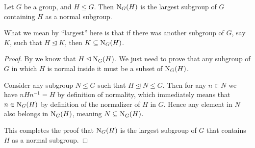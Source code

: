 \begin{proposition}\label{prop-normalizer-of-subgroup-is-largest-subgroup-containing-that-subgroup-as-a-normal-subgroup}
    Let $G$ be a group, and $H \leq G$. Then $\mathrm{N}_{G}(H)$ is the largest subgroup of $G$ containing $H$ as a normal subgroup.
\end{proposition}
\begin{remark}
    What we mean by ``largest'' here is that if there was another subgroup of $G$, say $K$, such that $H \unlhd K$, then $K \subseteq \mathrm{N}_{G}(H)$.
\end{remark}
\begin{proof}
    By  we know that $H \unlhd \mathrm{N}_{G}(H)$. We just need to prove that any subgroup of $G$ in which $H$ is normal inside it must be a subset of $\mathrm{N}_{G}(H)$.

    Consider any subgroup $N \leq G$ such that $H \unlhd N \leq G$. Then for any $n \in N$ we have $nHn^{-1} = H$ by definition of normality, which immediately means that $n \in \mathrm{N}_{G}(H)$ by definition of the normalizer of $H$ in $G$. Hence any element in $N$ also belongs in $\mathrm{N}_{G}(H)$, meaning $N \subseteq \mathrm{N}_{G}(H)$.

    This completes the proof that $\mathrm{N}_{G}(H)$ is the largest subgroup of $G$ that contains $H$ as a normal subgroup.
\end{proof}

